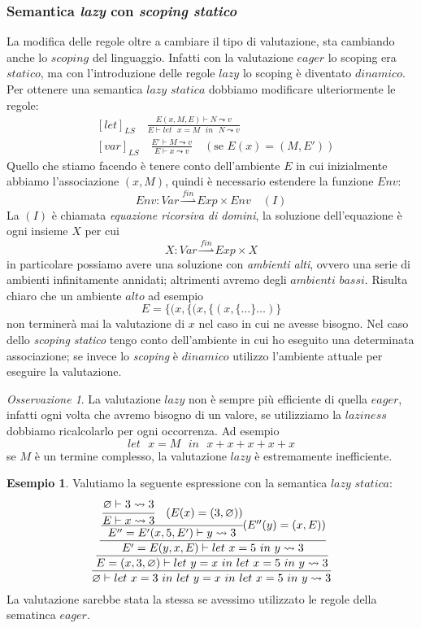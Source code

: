 \documentclass{article}
\theoremstyle{definition}
\theoremstyle{definition}
\theoremstyle{definition}
\newtheorem{example}[theorem]{Esempio}
\theoremstyle{remark}
\newtheorem{remark}[theorem]{Osservazione}
\begin{document}
    \subsubsection{Semantica \textit{lazy} con \textit{scoping statico}}
    La modifica delle regole oltre a cambiare il tipo
    di valutazione, sta cambiando anche lo $scoping$ del linguaggio. Infatti con la valutazione $eager$ lo scoping era $statico$, ma con l'introduzione delle regole $lazy$ lo scoping è diventato $dinamico$.
    Per ottenere una semantica $lazy$ $statica$ dobbiamo modificare ulteriormente le regole:
    \begin{align*}
         & [let]_{LS} \quad\frac{E(x,M,E)\vdash N \leadsto v}{E\vdash \text{$let$ $x=M$ $in$ $N$}\leadsto v}    \\
         & [var]_{LS} \quad \frac{E'\vdash M \leadsto v}{E\vdash x \leadsto v}\quad (\text{se $E(x) = (M,E')$})
    \end{align*}
    Quello che stiamo facendo è tenere conto dell'ambiente $E$ in cui inizialmente abbiamo l'associazione  $(x,M)$, quindi è necessario
    estendere la funzione $Env$:
    $$Env: Var\overset{fin}{\rightharpoonup} Exp \times Env \quad(I)$$
    La $(I)$ è chiamata \textit{equazione ricorsiva di domini}, la soluzione dell'equazione è ogni insieme $X$ per cui
    $$X : Var\overset{fin}{\rightharpoonup} Exp \times X$$
    in particolare possiamo avere una soluzione con \textit{ambienti alti}, ovvero una serie di ambienti infinitamente annidati; altrimenti avremo degli $ambienti$ $bassi$.
    Risulta chiaro che un ambiente $alto$ ad esempio
    $$E = \{(x,\{(x,\{(x,\{\dots\}\dots)\}$$
    non terminerà mai la valutazione di $x$ nel caso in cui ne avesse bisogno.
    Nel caso dello \textit{scoping statico} tengo conto dell'ambiente in cui ho eseguito una determinata associazione;
    se invece lo \textit{scoping} è $dinamico$ utilizzo l'ambiente attuale per eseguire la valutazione.
    \begin{remark}
        La valutazione $lazy$ non è sempre più efficiente di quella $eager$, infatti ogni volta che avremo bisogno di un valore, se utilizziamo la $laziness$ dobbiamo ricalcolarlo per ogni occorrenza. Ad esempio
        $$\text{$let$ $x = M$ $in$ $x+x+x+x+x$}$$
        se $M$ è un termine complesso, la valutazione $lazy$ è estremamente inefficiente.
    \end{remark}
    \begin{example}
        Valutiamo la seguente espressione con la semantica $lazy$ $statica$:
        $$\cfrac{\cfrac{\cfrac{\cfrac{\cfrac{\varnothing \vdash 3 \leadsto 3}
                        {E \vdash x \leadsto 3}\quad (E(x) = (3,\varnothing))}
                    {E'' = E'(x,5,E')\vdash y \leadsto 3}(E''(y) = (x,E))}
                    {E' = E(y,x,E)\vdash \text{$let$ $x=5$ $in$ $y$}\leadsto 3}}
                {E = (x,3,\varnothing)\vdash \text{$let$ $y= x$ $in$ $let$ $x=5$ $in$ $y$}\leadsto 3}}
            {\varnothing\vdash \text{$let$ $x=3$ $in$ $let$ $y= x$ $in$ $let$ $x=5$ $in$ $y$}\leadsto 3}$$
        La valutazione sarebbe stata la stessa se avessimo utilizzato le regole della sematinca $eager$.
    \end{example}
\end{document}
